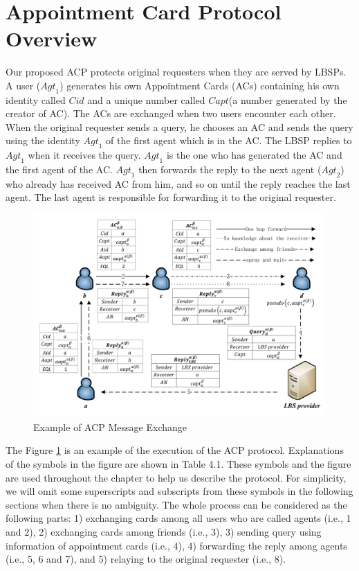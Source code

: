 \section{ Appointment Card Protocol Overview}

\noindent Our proposed ACP protects original requesters when they are served by LBSPs. A user (${Agt}_{1}$) generates his own Appointment Cards (ACs) containing his own identity called $Cid$ and a unique number called $Capt$(a number generated by the creator of AC). The ACs are exchanged when two users encounter each other. When the original requester sends a query, he chooses an AC and sends the query using the identity ${Agt}_{1}$ of the first agent which is in the AC. The LBSP replies to ${Agt}_{1}$ when it receives the query. ${Agt}_{1}$ is the one who has generated the AC and the first agent of the AC. ${Agt}_{1}$ then forwards the reply to the next agent (${Agt}_{2}$) who already has received AC from him, and so on until the reply reaches the last agent. The last agent is responsible for forwarding it to the original requester.

\begin{figure} [H]
  \centering 
  \includegraphics[width=6.0in]{figures/FIG_4_1_Example_of_ACP_Message_Exchange.png}
  \caption{Example of ACP Message Exchange} 
  \label{fig:EoACPME} %
\end{figure}


The Figure \ref{fig:EoACPME} is an example of the execution of the ACP protocol. Explanations of the symbols in the figure are shown in Table 4.1. These symbols and the figure are used throughout the chapter to help us describe the protocol. For simplicity, we will omit some superscripts and subscripts from these symbols in the following sections when there is no ambiguity. The whole process can be considered as the following parts: 1) exchanging cards among all users who are called agents (i.e., 1 and 2), 2) exchanging cards among friends (i.e., 3), 3) sending query using information of appointment cards (i.e., 4), 4) forwarding the reply among agents (i.e., 5, 6 and 7), and 5) relaying to the original requester (i.e., 8). 

